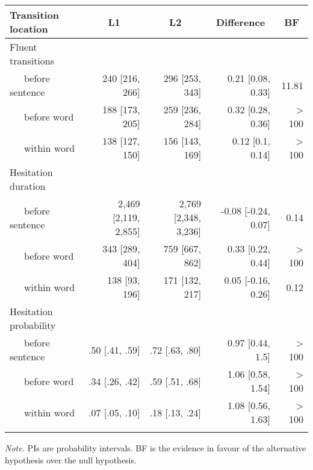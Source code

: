 \begin{appendix}
\begin{table}[tbp]
\begin{center}
\begin{threeparttable}
{\begin{tabular}{lrrrr}
\toprule
Transition location & \multicolumn{1}{c}{L1} & \multicolumn{1}{c}{L2} & \multicolumn{1}{c}{Difference} & \multicolumn{1}{c}{BF}\\
\midrule
Fluent transitions &  &  &  & \\
\ \ \ before sentence & 240 [216, 266] & 296 [253, 343] & 0.21 [0.08, 0.33] & 11.81\\
\ \ \ before word & 188 [173, 205] & 259 [236, 284] & 0.32 [0.28, 0.36] & > 100\\
\ \ \ within word & 138 [127, 150] & 156 [143, 169] & 0.12 [0.1, 0.14] & > 100\\
Hesitation duration &  &  &  & \\
\ \ \ before sentence & 2,469 [2,119, 2,855] & 2,769 [2,348, 3,236] & -0.08 [-0.24, 0.07] & 0.14\\
\ \ \ before word & 343 [289, 404] & 759 [667, 862] & 0.33 [0.22, 0.44] & > 100\\
\ \ \ within word & 138 [93, 196] & 171 [132, 217] & 0.05 [-0.16, 0.26] & 0.12\\
Hesitation probability &  &  &  & \\
\ \ \ before sentence & .50 [.41, .59] & .72 [.63, .80] & 0.97 [0.44, 1.5] & > 100\\
\ \ \ before word & .34 [.26, .42] & .59 [.51, .68] & 1.06 [0.58, 1.54] & > 100\\
\ \ \ within word & .07 [.05, .10] & .18 [.13, .24] & 1.08 [0.56, 1.63] & > 100\\
\bottomrule
\addlinespace
\end{tabular}

}

\begin{tablenotes}[para]
\normalsize{\textit{Note.} PIs are probability intervals. BF is the evidence in favour of the alternative hypothesis over the null hypothesis.}
\end{tablenotes}

\end{threeparttable}
\end{center}

\end{table}
\end{appendix}
